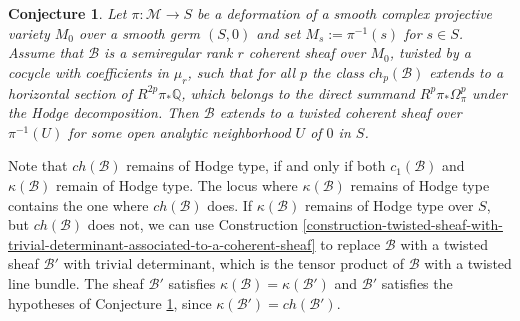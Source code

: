 \documentclass[12pt]{amsart}
\numberwithin{equation}{subsection}
\theoremstyle{plain}
\newtheorem{conj}[thm]{Conjecture}
\theoremstyle{definition}
\newcommand{\B}{{\mathcal B}}
\newcommand{\QQ}{{\mathbb Q}}
\newcommand{\M}{{\mathcal M}}
\newcommand{\restricted}[2]{#1_{\mid_{#2}}}
\begin{document}
\begin{conj}
\label{conjecture-semiregular-twisted-sheaves-deform}
Let $\pi:\M\rightarrow S$ be a deformation of a smooth complex projective variety $M_0$ over a smooth germ $(S,0)$ and set $M_s:=\pi^{-1}(s)$ for $s\in S$. Assume that $\B$ is a semiregular  rank $r$ coherent sheaf over $M_0$, twisted by a cocycle with coefficients in $\mu_r$, 
such that for all $p$ the class $ch_p(\B)$
extends to a horizontal section of $R^{2p}\pi_*\QQ$, which belongs to the direct summand $R^p\pi_*\Omega^p_\pi$ under the Hodge decomposition. Then $\B$ extends
to a twisted coherent sheaf over  $\pi^{-1}(U)$ for some open analytic neighborhood 
$U$ of $0$ in $S$. 
\end{conj}

Note that $ch(\B)$ remains of Hodge type, if and only if both $c_1(\B)$ and $\kappa(\B)$ remain of Hodge type. The locus where $\kappa(\B)$ remains of Hodge type contains the one where $ch(\B)$ does. If $\kappa(\B)$ remains of Hodge type over $S$, but $ch(\B)$ does not, 
we can use Construction \ref{construction-twisted-sheaf-with-trivial-determinant-associated-to-a-coherent-sheaf} to replace $\B$ with a twisted sheaf $\B'$ with trivial determinant, which is the tensor product of $\B$ with a twisted line bundle. The sheaf $\B'$ satisfies $\kappa(\B)=\kappa(\B')$ and $\B'$ satisfies the hypotheses of Conjecture \ref{conjecture-semiregular-twisted-sheaves-deform}, since $\kappa(\B')=ch(\B')$. 
\end{document}

